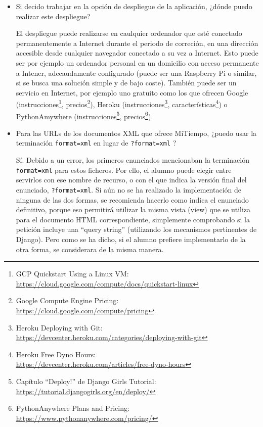 \begin{itemize}
\item Si decido trabajar en la opción de despliegue de la aplicación, ¿dónde puedo realizar este despliegue?

  El despliegue puede realizarse en caulquier ordenador que esté conectado permanentemente a Internet durante el periodo de correción, en una dirección accesible desde cualquier navegador conectado a su vez a Internet. Esto puede ser por ejemplo un ordenador personal en un domicilio con acceso permanente a Intener, adecaudamente configurado (puede ser una Raspberry Pi o similar, si se busca una solución simple y de bajo coste). También puede ser un servicio en Internet, por ejemplo uno gratuito como los que ofrecen Google (instrucciones\footnote{GCP Quickstart Using a Linux VM:\\ \url{https://cloud.google.com/compute/docs/quickstart-linux}}, precios\footnote{Google Compute Engine Pricing:\\ \url{https://cloud.google.com/compute/pricing}}), Heroku (instrucciones\footnote{Heroku Deploying with Git:\\ \url{https://devcenter.heroku.com/categories/deploying-with-git}}, características\footnote{Heroku Free Dyno Hours:\\ \url{https://devcenter.heroku.com/articles/free-dyno-hours}}) o PythonAmywhere (instrucciones\footnote{Capítulo ``Deploy!'' de Django Girls Tutorial:\\ \url{https://tutorial.djangogirls.org/en/deploy/}}, precios\footnote{PythonAnywhere Plans and Pricing:\\ \url{https://www.pythonanywhere.com/pricing/}}).

\item Para las URLs de los documentos XML que ofrece MiTiempo, ¿puedo usar la terminación \verb|format=xml| en lugar de \verb|?format=xml| ?

  Sí. Debido a un error, los primeros enunciados mencionaban la terminación \verb|format=xml| para estos ficheros. Por ello, el alumno puede elegir entre servirlos con ese nombre de recurso, o con el que indica la versión final del enunciado, \verb|?format=xml|. Si aún no se ha realizado la implementación de ninguna de las dos formas, se recomienda hacerlo como indica el enunciado definitivo, porque eso permitirá utilizar la misma vista (view) que se utiliza para el documento HTML correspondiente, simplemente comprobando si la petición incluye una ``query string'' (utilizando los mecanismos pertinentes de Django). Pero como se ha dicho, si el alumno prefiere implementarlo de la otra forma, se considerara de la misma manera.
\end{itemize}


